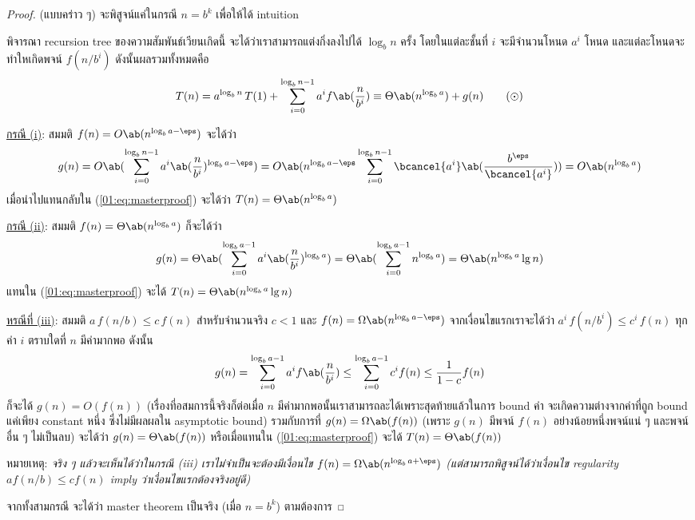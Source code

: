 \begin{proof}
	(แบบคร่าว ๆ) จะพิสูจน์แค่ในกรณี $n = b^k$ เพื่อให้ได้ intuition
	
	พิจารณา recursion tree ของความสัมพันธ์เวียนเกิดนี้ จะได้ว่าเราสามารถแต่งกิ่งลงไปได้ $\log_b n$ ครั้ง โดยในแต่ละชั้นที่ $i$ จะมีจำนวนโหนด $a^i$ โหนด และแต่ละโหนดจะทำใหเกิดพจน์ $f(n/b^i)$ ดังนั้นผลรวมทั้งหมดคือ
	\begin{equation}
		T(n) = a^{\log_b n}\,T(1) + \sum_{i=0}^{\log_b n - 1} a^i f\ab(\frac{n}{b^i}) \equiv \Theta\ab(n^{\log_b a}) + g(n)\tag{$\odot$}\label{01:eq:masterproof}
	\end{equation}

	\underline{กรณี (i)}: สมมติ $f(n) = O\ab(n^{\log_b a - \eps})$ จะได้ว่า
	\[
		g(n) = O\ab(\sum_{i=0}^{\log_b n - 1} a^i \ab(\frac{n}{b^i})^{\log_b a -\eps}) = O\ab(n^{\log_b a -\eps}\sum_{i=0}^{\log_bn-1}\bcancel{a^i}\ab(\frac{b^\eps}{\bcancel{a^i}})) = O\ab(n^{\log_b a})
	\]
	เมื่อนำไปแทนกลับใน (\ref{01:eq:masterproof}) จะได้ว่า $T(n) = \Theta\ab(n^{\log_ba})$

	\underline{กรณี (ii)}: สมมติ $f(n) = \Theta\ab(n^{\log_b a})$ ก็จะได้ว่า
	\[
		g(n) = \Theta\ab(\sum_{i=0}^{\log_ba-1}a^i\ab(\frac{n}{b^i})^{\log_ba}) = \Theta\ab(\sum_{i=0}^{\log_ba-1}n^{\log_ba}) = \Theta\ab(n^{\log_ba}\lg n)
	\]
	แทนใน (\ref{01:eq:masterproof}) จะได้ $T(n) = \Theta\ab(n^{\log_ba}\lg n)$

	\underline{หรณีที่ (iii)}: สมมติ $a\,f(n/b) \leq c\,f(n)$ สำหรับจำนวนจริง $c < 1$ และ $f(n) = \Omega\ab(n^{\log_b a - \eps})$ จากเงื่อนไขแรกเราจะได้ว่า $a^i\,f(n/b^i) \leq c^i\,f(n)$ ทุกค่า $i$ ตราบใดที่ $n$ มีค่ามากพอ ดังนั้น
	\[
		g(n) = \sum_{i=0}^{\log_ba-1}a^if\ab(\frac{n}{b^i}) \leq \sum_{i=0}^{\log_ba-1}c^if(n) \leq \frac{1}{1-c}f(n)
	\]
	ก็จะได้ $g(n) = O(f(n))$ (เรื่องที่อสมการนี้จริงก็ต่อเมื่อ $n$ มีค่ามากพอนั้นเราสามารถละได้เพราะสุดท้ายแล้วในการ bound ค่า จะเกิดความต่างจากค่าที่ถูก bound แค่เพียง constant หนึ่ง ซึ่งไม่มีผลผลใน asymptotic bound) รวมกับการที่ $g(n) = \Omega\ab(f(n))$ (เพราะ $g(n)$ มีพจน์ $f(n)$ อย่างน้อยหนึ่งพจน์แน่ ๆ และพจน์อื่น ๆ ไม่เป็นลบ) จะได้ว่า $g(n) = \Theta\ab(f(n))$ หรือเมื่อแทนใน (\ref{01:eq:masterproof}) จะได้ $T(n) = \Theta\ab(f(n))$

	หมายเหตุ: \emph{จริง ๆ แล้วจะเห็นได้ว่าในกรณี (iii) เราไม่จำเป็นจะต้องมีเงื่อนไข $f(n) = \Omega\ab(n^{\log_b a + \eps})$ (แต่สามารถพิสูจน์ได้ว่าเงื่อนไข regularity $af(n/b) \leq cf(n)$ imply ว่าเงื่อนไขแรกต้องจริงอยู่ดี)}

	จากทั้งสามกรณี จะได้ว่า master theorem เป็นจริง (เมื่อ $n = b^k$) ตามต้องการ
\end{proof}